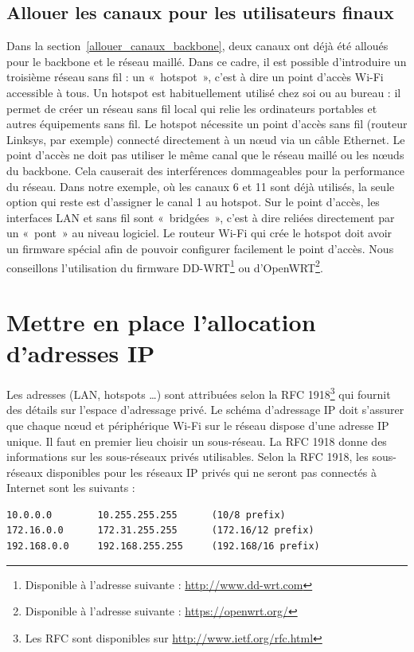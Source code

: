 \documentclass[a4paper,french,11pt,twoside]{article}
\begin{document}
\subsection{Allouer les canaux pour les utilisateurs finaux}

Dans la section~\ref{allouer_canaux_backbone}, deux canaux ont déjà été alloués pour le backbone et le réseau maillé. Dans ce cadre, il est possible d'introduire un troisième réseau sans fil : un «~hotspot~», c'est à dire un point d'accès Wi-Fi accessible à tous. Un hotspot est habituellement utilisé chez soi ou au bureau : il permet de créer un réseau sans fil local qui relie les ordinateurs portables et autres équipements sans fil. Le hotspot nécessite un point d'accès sans fil (routeur Linksys, par exemple) connecté directement à un nœud via un câble Ethernet. Le point d'accès ne doit pas utiliser le même canal que le réseau maillé ou les nœuds du backbone. Cela causerait des interférences dommageables pour la performance du réseau. Dans notre exemple, où les canaux 6 et 11 sont déjà utilisés, la seule option qui reste est d'assigner le canal 1 au hotspot. Sur le point d'accès, les interfaces LAN et sans fil sont «~bridgées~», c'est à dire reliées directement par un «~pont~» au niveau logiciel. Le routeur Wi-Fi qui crée le hotspot doit avoir un firmware spécial afin de pouvoir configurer facilement le point d'accès. Nous conseillons l'utilisation du firmware DD-WRT\footnote{Disponible à l'adresse suivante : \url{http://www.dd-wrt.com}} ou d'OpenWRT\footnote{Disponible à l'adresse suivante : \url{https://openwrt.org/}}.

\section{Mettre en place l'allocation d'adresses IP}

Les adresses (LAN, hotspots …) sont attribuées selon la RFC 1918\footnote{Les RFC sont disponibles sur \url{http://www.ietf.org/rfc.html}} qui fournit des détails sur l'espace d'adressage privé. Le schéma d'adressage IP doit s'assurer que chaque nœud et périphérique Wi-Fi sur le réseau dispose d'une adresse IP unique. Il faut en premier lieu choisir un sous-réseau. La RFC 1918 donne des informations sur les sous-réseaux privés utilisables. Selon la RFC 1918, les sous-réseaux disponibles pour les réseaux IP privés qui ne seront pas connectés à Internet sont les suivants :

\begin{verbatim}
10.0.0.0        10.255.255.255      (10/8 prefix)
172.16.0.0      172.31.255.255      (172.16/12 prefix)
192.168.0.0     192.168.255.255     (192.168/16 prefix)
\end{verbatim}
\end{document}
